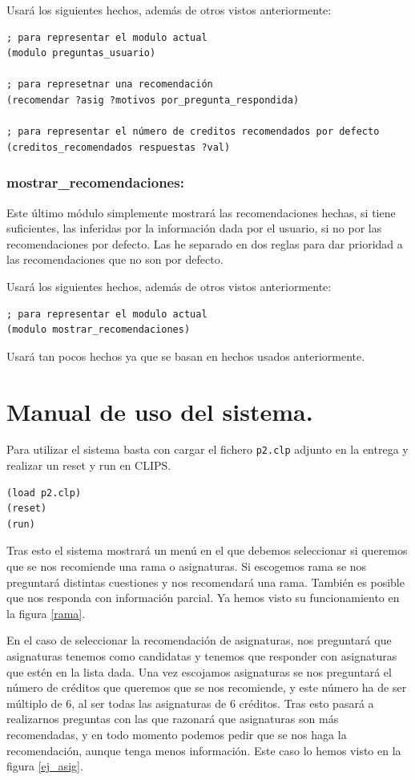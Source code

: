 \documentclass[12pt, spanish]{article}
\begin{document}
Usará los siguientes hechos, además de otros vistos anteriormente:
\begin{lstlisting}
; para representar el modulo actual
(modulo preguntas_usuario)

; para represetnar una recomendación
(recomendar ?asig ?motivos por_pregunta_respondida)

; para representar el número de creditos recomendados por defecto
(creditos_recomendados respuestas ?val)
\end{lstlisting}



\subsubsection*{mostrar\_recomendaciones:}

Este último módulo simplemente mostrará las recomendaciones hechas, si tiene suficientes, las inferidas por la información dada por el usuario, si no por las recomendaciones por defecto. Las he separado en dos reglas para dar prioridad a las recomendaciones que no son por defecto.

 
Usará los siguientes hechos, además de otros vistos anteriormente:
\begin{lstlisting}
; para representar el modulo actual
(modulo mostrar_recomendaciones)
\end{lstlisting}

Usará tan pocos hechos ya que se basan en hechos usados anteriormente.



\newpage

\section{Manual de uso del sistema.}

Para utilizar el sistema basta con cargar el fichero \texttt{p2.clp} adjunto en la entrega y realizar un reset y run en CLIPS.

\begin{lstlisting}
(load p2.clp)
(reset)
(run)
\end{lstlisting}

Tras esto el sistema mostrará un menú en el que debemos seleccionar si queremos que se nos recomiende una rama o asignaturas. Si escogemos rama se nos preguntará distintas cuestiones y nos recomendará una rama. También es posible que nos responda con información parcial. Ya hemos visto su funcionamiento en la figura \ref{rama}.


En el caso de seleccionar la recomendación de asignaturas, nos preguntará que asignaturas tenemos como candidatas y tenemos que responder con asignaturas que estén en la lista dada. Una vez escojamos asignaturas se nos preguntará el número de créditos que queremos que se nos recomiende, y este número ha de ser múltiplo de 6, al ser todas las asignaturas de 6 créditos. Tras esto pasará a realizarnos preguntas con las que razonará que asignaturas son más recomendadas, y en todo momento podemos pedir que se nos haga la recomendación, aunque tenga menos información. Este caso lo hemos visto en la figura \ref{ej_asig}.
\end{document}
